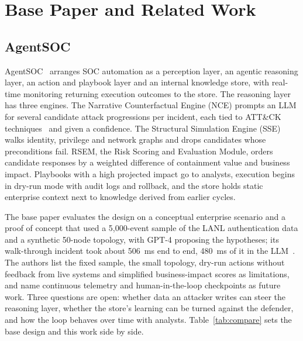 \documentclass[conference]{IEEEtran}
\begin{document}
\section{Base Paper and Related Work}\label{sec:base}

\subsection{AgentSOC}
AgentSOC~\cite{agentsoc} arranges SOC automation as a perception layer, an agentic reasoning layer, an action and
playbook layer and an internal knowledge store, with real-time monitoring returning execution outcomes to the
store. The reasoning layer has three engines. The Narrative Counterfactual Engine (NCE) prompts an LLM for several
candidate attack progressions per incident, each tied to ATT\&CK techniques~\cite{attack} and given a confidence.
The Structural Simulation Engine (SSE) walks identity, privilege and network graphs and drops candidates whose
preconditions fail. RSEM, the Risk Scoring and Evaluation Module, orders candidate responses by a weighted
difference of containment value and business impact. Playbooks with a high projected impact go to analysts, execution begins
in dry-run mode with audit logs and rollback, and the store holds static enterprise context next to knowledge
derived from earlier cycles.

The base paper evaluates the design on a conceptual enterprise scenario and a proof of concept that used a
5,000-event sample of the LANL authentication data and a synthetic 50-node topology, with GPT-4 proposing the
hypotheses; its walk-through incident took about 506~ms end to end, 480~ms of it in the LLM~\cite{agentsoc}. The
authors list the fixed sample, the small topology, dry-run actions without feedback from live systems and
simplified business-impact scores as limitations, and name continuous telemetry and human-in-the-loop checkpoints
as future work. Three questions are open: whether data an attacker writes can steer the reasoning layer, whether
the store's learning can be turned against the defender, and how the loop behaves over time with analysts.
Table~\ref{tab:compare} sets the base design and this work side by side.
\end{document}
